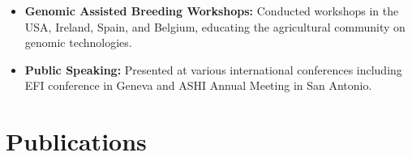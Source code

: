 \documentclass[11pt,a4paper,]{moderncv}
\providecommand{\tightlist}{%
	\setlength{\itemsep}{0pt}\setlength{\parskip}{0pt}}
\begin{document}
\begin{itemize}
\tightlist
\item
  \textbf{Genomic Assisted Breeding Workshops:} Conducted workshops in
  the USA, Ireland, Spain, and Belgium, educating the agricultural
  community on genomic technologies.
\item
  \textbf{Public Speaking:} Presented at various international
  conferences including EFI conference in Geneva and ASHI Annual Meeting
  in San Antonio.
\end{itemize}

\section{Publications}\label{publications}

\label{refs-fc9fcad9798ae22e92c54d59a6d1bc3c}
\end{document}

